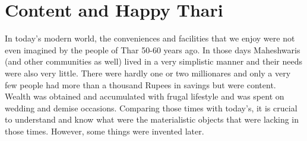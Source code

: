\chapter{Content and Happy Thari}
In today's modern world, the conveniences and facilities that we enjoy were not even imagined by the people of Thar 50-60 years ago. In those days Maheshwaris (and other communities as well) lived in a very simplistic manner and their needs were also very little. There were hardly one or two millionares and only a very few people had more than a thousand Rupees in savings but were content. Wealth was obtained and accumulated with frugal lifestyle and was spent on wedding and demise occasions. Comparing those times with today's, it is crucial to understand and know what were the materialistic objects that were lacking in those times. However, some things were invented later.

